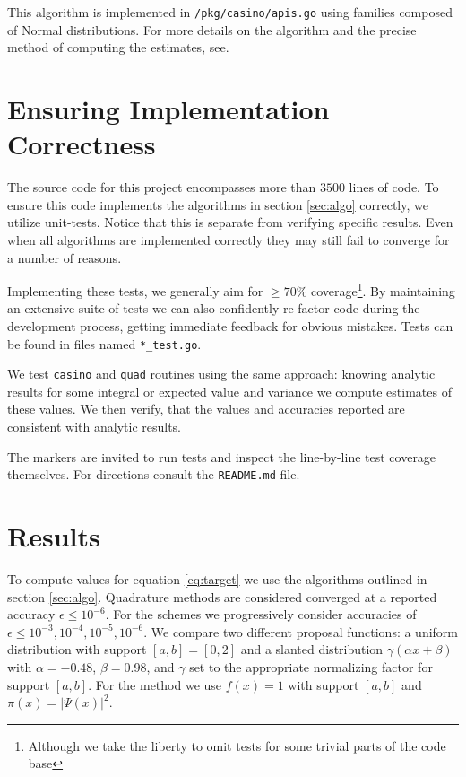 \documentclass[10pt, a4paper]{article}
\begin{document}
  This algorithm is implemented in \texttt{/pkg/casino/apis.go} using families composed of Normal distributions.
  For more details on the algorithm and the precise method of computing the estimates, see\cite{apis}.

\section{Ensuring Implementation Correctness}
  \label{sec:tests}
  The source code for this project encompasses more than $3500$ lines of code\footnotemark. To ensure
  this code implements the algorithms in section \ref{sec:algo} correctly, we utilize unit-tests.
  Notice that this is separate from verifying specific results. Even when all algorithms are
  implemented correctly they may still fail to converge for a number of reasons\cite{nr}.


  Implementing these tests, we generally aim for $\ge 70\%$ coverage\footnote{Although
  we take the liberty to omit tests for some trivial parts of the code base}. By maintaining an extensive
  suite of tests we can also confidently re-factor code during the development process, getting immediate
  feedback for obvious mistakes. Tests can be found in files named \texttt{*\_test.go}.

  We test \texttt{casino} and \texttt{quad} routines using the same approach: knowing analytic
  results for some integral or expected value and variance we compute estimates
  of these values. We then verify, that the values and accuracies reported are consistent with
  analytic results.

  The markers are invited to run tests and inspect the line-by-line test coverage themselves.
  For directions consult the \texttt{README.md} file.

\section{Results}
  \label{sec:results}
  To compute values for equation \ref{eq:target} we use the algorithms outlined in section \ref{sec:algo}.
  Quadrature methods are considered converged at a reported accuracy $\epsilon \le 10^{-6}$.
  For the \is{} schemes we progressively consider accuracies of $\epsilon \le 10^{-3},10^{-4},10^{-5},10^{-6}$.
  We compare two different proposal functions: a uniform distribution with support $[a,b] = [0,2]$ and
  a slanted distribution $\gamma(\alpha x + \beta)$ with $\alpha = -0.48$, $\beta = 0.98$, and
  $\gamma$ set to the appropriate normalizing factor for support $[a,b]$.
  For the \apis{} method we use $f(x) = 1$ with support $[a,b]$ and $\pi(x) = |\Psi(x)|^2$.
\end{document}
